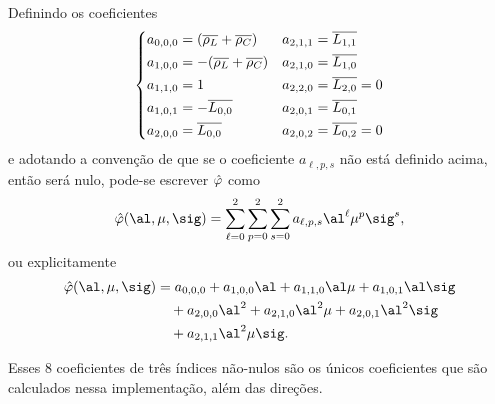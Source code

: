 Definindo os coeficientes \[ \left\{
\begin{aligned}
a_{0,0,0} &= (\overline{\rho_L}+ \overline{\rho_C})     & a_{2,1,1} &=
\overline{L_{1,1}}\\
a_{1,0,0} &= - (\overline{\rho_L} + \overline{\rho_C})   & a_{2,1,0} &=
\overline{L_{1,0}}\\
a_{1,1,0} &= 1 				    & a_{2,2,0} &= \overline{L_{2,0}}=0\\
a_{1,0,1} &= -  \overline{L_{0,0}} & a_{2,0,1} &= \overline{L_{0,1}}\\
a_{2,0,0} &=  \overline{L_{0,0}} & a_{2,0,2} &= \overline{L_{0,2}}=0\\
\end{aligned}\right.	
\]
e adotando a convenção de que se o coeficiente  $a_{\ell,p,s}$ não está definido
acima, então será nulo, pode-se escrever $\hat{\varphi}$ como
\[
\nextphi(\al,\mu,\sig) = \sum_{\ell= 0}^2\sum_{p=0}^2 
\sum_{s=0}^2a_{\ell,p,s}\al^\ell\mu^p\sig^s,
\]   
ou explicitamente
\begin{equation}
\begin{aligned}
\nextphi(\al,\mu,\sig) & = 	a_{0,0,0} + a_{1,0,0}\al + a_{1,1,0}\al\mu + 
a_{1,0,1}\al\sig  
\\
&\quad + a_{2,0,0}\al^2
 + a_{2,1,0}\al^2\mu   + a_{2,0,1}\al^2\sig\\ 
& \quad + a_{2,1,1}\al^2\mu\sig.
\end{aligned}
\label{eq:varphi-poly-form}
\end{equation}

Esses 8 
coeficientes de três índices  não-nulos são
os únicos coeficientes que são calculados nessa implementação, além das
direções.

% 



